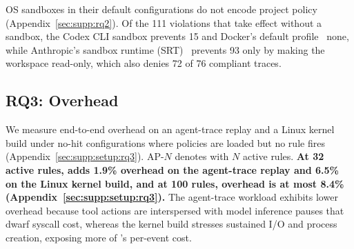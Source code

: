 OS sandboxes in their default configurations do not encode project policy (Appendix~\ref{sec:supp:rq2}).
Of the 111 violations that take effect without a sandbox, the Codex CLI sandbox prevents 15 and Docker's default profile~\cite{docker-seccomp} none, while Anthropic's sandbox runtime (SRT)~\cite{anthropic2025srt} prevents 93 only by making the workspace read-only, which also denies 72 of 76 compliant traces.
\subsection{RQ3: Overhead}
\label{sec:eval:rq3}

We measure end-to-end overhead on an agent-trace replay and a Linux kernel build under no-hit \sys{} configurations where policies are loaded but no rule fires (Appendix~\ref{sec:supp:setup:rq3}). AP-$N$ denotes \sys{} with $N$ active rules.
\noindent\textbf{At 32 active rules, \sys{} adds 1.9\% overhead on the agent-trace replay and 6.5\% on the Linux kernel build, and at 100 rules, overhead is at most 8.4\% (Appendix~\ref{sec:supp:setup:rq3}).}
The agent-trace workload exhibits lower overhead because tool actions are interspersed with model inference pauses that dwarf syscall cost, whereas the kernel build stresses sustained I/O and process creation, exposing more of \sys{}'s per-event cost.

